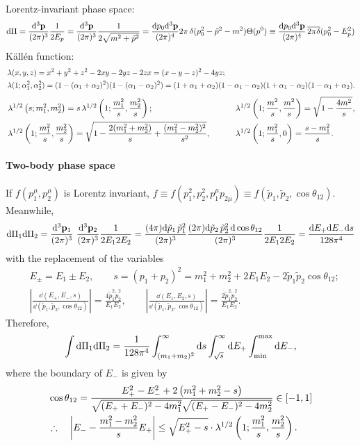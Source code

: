 \documentclass[CheatSheet]{subfiles}
\begin{document}
Lorentz-invariant phase space:
\begin{align}
  \dd\Pi
   = \ddP{p}\frac{1}{2E_{p}}
   = \ddP{p}\frac{1}{2\sqrt{m^2+\tilde p^2}}
   = \frac{\dd p_0\dd^3\vc p}{(2\pi)^4}2\pi\diracdelta(p_0^2-\tilde p^2-m^2)\Theta(p^0)
   \equiv \frac{\dd p_0\dd^3\vc p}{(2\pi)^4}\diracdeltabar(p_0^2-E_p^2)
\end{align}
K\"all\'en function:
\begin{align*}
&\Kallen(x,y,z)
= x^2+y^2+z^2-2xy-2yz-2zx
= (x-y-z)^2-4yz;
\\
&
\Kallen(1;\alpha_1^2,\alpha_2^2)
= (1-(\alpha_1+\alpha_2)^2)(1-(\alpha_1-\alpha_2)^2)
= (1+\alpha_1+\alpha_2)(1-\alpha_1-\alpha_2)(1+\alpha_1-\alpha_2)(1-\alpha_1+\alpha_2).
\end{align*}
\begin{alignat*}{2}
&\Kallen[1/2]\left(s;m_1^2, m_2^2\right) = s\Kallen[1/2]\left(1;\frac{m_1^2}{s}, \frac{m_2^2}{s}\right);&
\qquad
&\Kallen[1/2]\left(1;\frac{m^2}{s},\frac{m^2}{s}\right)
= \sqrt{1-\frac{4 m^2}{s}},\\
&\Kallen[1/2]\left(1;\frac{m_1^2}{s},\frac{m_2^2}{s}\right)
= \sqrt{1-\frac{2 (m_1^2+m_2^2)}{s}+\frac{(m_1^2-m_2^2)^2}{s^2}},&
&\Kallen[1/2]\left(1;\frac{m_1^2}{s},0\right)
= \frac{s-m_1^2}{s}.
\end{alignat*}
\paragraph{Two-body phase space}
If $f(p_1^\mu,p_2^\mu)$ is Lorentz invariant, $f\equiv f(p_1^2,p_2^2,p_1^\mu p_{2\mu})\equiv f(\tilde p_1,\tilde p_2,\cos\theta_{12})$.
Meanwhile,
\begin{equation}
 \dd\Pi_1\dd\Pi_2
=
\ddP{p_1}\,\,\ddP{p_2}\frac{1}{2E_12E_2}
=
\frac{(4\pi)\dd\tilde p_1\,\tilde p_1^2}{(2\pi)^3}
\frac{(2\pi)\dd\tilde p_2\,\tilde p_2^2\,\dd\cos\theta_{12}}{(2\pi)^3}\frac{1}{2E_12E_2}
=
\frac{\dd E_+\dd E_- \dd s}{128\pi^4}
\end{equation}
with the replacement of the variables
\begin{align*}
& E_\pm = E_1\pm E_2,
\qquad
s=(p_1+p_2)^2=m_1^2 + m_2^2 + 2E_1E_2 - 2\tilde p_1 \tilde p_2\cos\theta_{12};\\
&
\left|\frac{\dd(E_+,E_-,s)}{\dd(\tilde p_1,\tilde  p_2, \cos\theta_{12})}\right|=\frac{4\tilde p_1^2\tilde p_2^2}{E_1E_2},
\qquad
\left|\frac{\dd(E_1,E_2,s)}{\dd(\tilde p_1,\tilde  p_2, \cos\theta_{12})}\right|=\frac{2\tilde p_1^2\tilde p_2^2}{E_1E_2}.
\end{align*}
Therefore, 
\begin{equation}
 \int\dd\Pi_1\dd\Pi_2
=
\frac{1}{128\pi^4}
\int_{(m_1+m_2)^2}^\infty\dd s
\int_{\sqrt{s}}^\infty\dd E_+
\int\w{min}^{\mathrm{max}}\dd E_-,
\end{equation}
where the boundary of $E_-$ is given by
\begin{align*}
 &\cos\theta_{12}=\frac{E_+^2-E_-^2+2 \left(m_1^2+m_2^2-s\right)}{\sqrt{(E_++E_-)^2-4 m_1^2}\sqrt{(E_+-E_-)^2-4 m_2^2}} \in [-1,1]\\
 &\therefore\quad
\left|E_- - \frac{m_1^2-m_2^2}{s}E_+\right| 
\le
\sqrt{E_+^2-s}\cdot\Kallen[1/2]\left(1;\frac{m_1^2}{s},\frac{m_2^2}{s}\right).
\end{align*}
\end{document}
